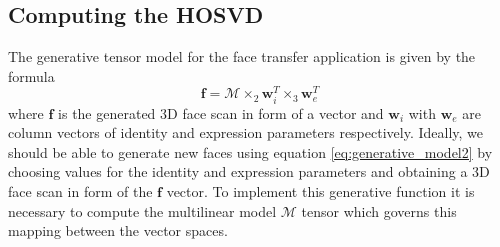 \documentclass[11pt,a4paper,twoside]{report}
\begin{document}
\subsection{Computing the HOSVD}\label{s:hosvd}
The generative tensor model for the face transfer application is given by the formula 
\begin{equation} \label{eq:generative_model2}
\mathbf{f} = \mathcal{M} \times_2 \mathbf{w}_i^T \times_3 \mathbf{w}_e^T
\end{equation}
where $\mathbf{f}$ is the generated 3D face scan in form of a vector and
$\mathbf{w}_i$ with $\mathbf{w}_e$ are column vectors of identity and expression
parameters respectively. Ideally, we should be able to generate new faces using
equation \ref{eq:generative_model2} by choosing values for the identity and
expression parameters and obtaining a 3D face scan in form of the $\mathbf{f}$
vector. To implement this generative function it is necessary to compute the multilinear model
$\mathcal{M}$ tensor which governs this mapping between the vector spaces.
\end{document}
